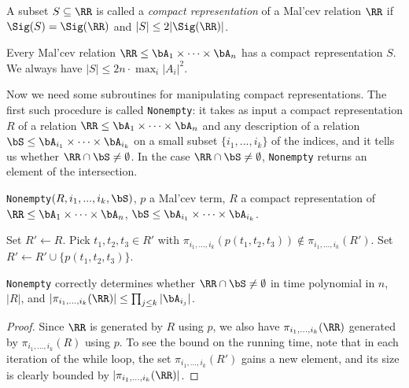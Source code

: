 \begin{defn} A subset $S \subseteq \RR$ is called a \emph{compact representation} of a Mal'cev relation $\RR$ if $\Sig(S) = \Sig(\RR)$ and $|S| \le 2|\Sig(\RR)|$.
\end{defn}

\begin{prop} Every Mal'cev relation $\RR \le \bA_1 \times \cdots \times \bA_n$ has a compact representation $S$. We always have $|S| \le 2n\cdot \max_i |A_i|^2$.
\end{prop}

Now we need some subroutines for manipulating compact representations. The first such procedure is called \texttt{Nonempty}: it takes as input a compact representation $R$ of a relation $\RR \le \bA_1 \times \cdots \times \bA_n$ and any description of a relation $\bS \le \bA_{i_1} \times \cdots \times \bA_{i_k}$ on a small subset $\{i_1, ..., i_k\}$ of the indices, and it tells us whether $\RR\cap \bS \ne \emptyset$. In the case $\RR \cap \bS \ne \emptyset$, \texttt{Nonempty} returns an element of the intersection.

\begin{algorithm}
\caption{\texttt{Nonempty}$(R, i_1, ..., i_k, \bS)$, $p$ a Mal'cev term, $R$ a compact representation of $\RR \le \bA_1\times \cdots\times \bA_n$, $\bS \le \bA_{i_1} \times \cdots \times \bA_{i_k}$.}
\begin{algorithmic}[1]
\State Set $R' \gets R$.
\State Pick $t_1, t_2, t_3 \in R'$ with $\pi_{i_1, ..., i_k}(p(t_1,t_2,t_3)) \not\in \pi_{i_1, ..., i_k}(R')$.
\State Set $R' \gets R' \cup \{p(t_1,t_2,t_3)\}$.
\EndWhile
{}
\State {}
\Else
\State {}
\EndIf
\end{algorithmic}
\end{algorithm}

\begin{prop} \texttt{Nonempty} correctly determines whether $\RR \cap \bS \ne \emptyset$ in time polynomial in $n$, $|R|$, and $|\pi_{i_1, ..., i_k}(\RR)| \le \prod_{j \le k} |\bA_{i_j}|$.
\end{prop}
\begin{proof} Since $\RR$ is generated by $R$ using $p$, we also have $\pi_{i_1,...,i_k}(\RR)$ generated by $\pi_{i_1, ..., i_k}(R)$ using $p$. To see the bound on the running time, note that in each iteration of the while loop, the set $\pi_{i_1, ..., i_k}(R')$ gains a new element, and its size is clearly bounded by $|\pi_{i_1, ..., i_k}(\RR)|$.
\end{proof}

